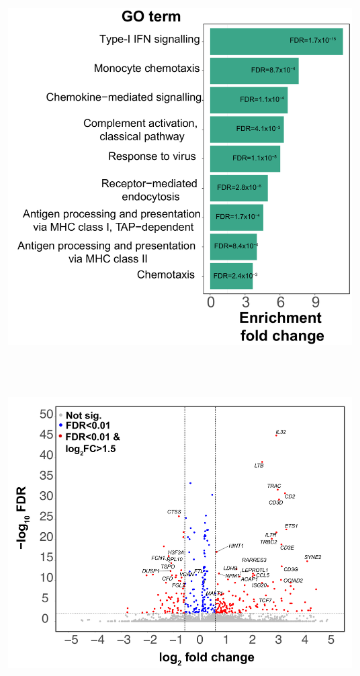 \begin{figure}[htbp]
	\centering
	\begin{subfigure}[b]{0.48\textwidth}
		\centering 
		\includegraphics[width=\textwidth]{./Results3/pdfs/PSA_scanpy_single_cell_cluster_1_upregulated_GO_barplot_reduced}
		\caption{}
	\end{subfigure}
	~
	\begin{subfigure}[b]{0.50\textwidth} 
		\centering
		\includegraphics[width=\textwidth]{./Results3/pdfs/PSA_scanpy_single_cell_cluster_4_volcano_plot}

\end{subfigure}
\end{figure}
